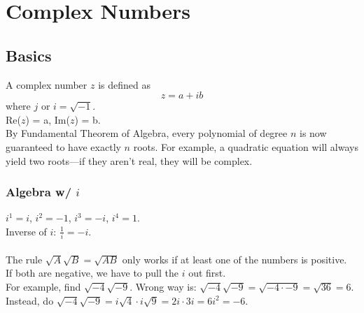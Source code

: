 \documentclass[../linear-algebra.tex]{subfiles}
\begin{document}
\section{Complex Numbers}
\subsection{Basics}
A complex number $z$ is defined as
$$z = a + ib$$
where $j$ or $i = \sqrt{-1}$.\\
Re($z$) = a, Im($z$) = b.\\
By Fundamental Theorem of Algebra, every polynomial of degree $n$ is now guaranteed to have exactly $n$ roots.
For example, a quadratic equation will always yield two roots—if they aren't real, they will be complex.

\subsubsection{Algebra w/ $i$}
$i^1 = i$, $i^2 = -1$, $i^3 = -i$, $i^4 = 1$.\\
Inverse of $i$: $\frac{1}{i} = -i$.\\
\\
The rule $\sqrt{A}\sqrt{B} = \sqrt{AB}$ only works if at least one of the numbers is positive.\\
If both are negative, we have to pull the $i$ out first.\\
For example, find $\sqrt{-4}\sqrt{-9}$. Wrong way is: $\sqrt{-4}\sqrt{-9} = \sqrt{-4\cdot -9} =\sqrt{36} = 6$.\\
Instead, do $\sqrt{-4}\sqrt{-9} = i\sqrt{4}\cdot i\sqrt{9} = 2i\cdot 3i = 6i^2 = -6$.
\end{document}
